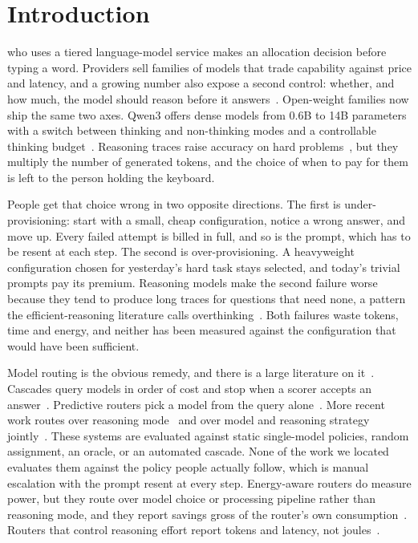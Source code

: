 \section{Introduction}
\label{sec:introduction}

 who uses a tiered language-model service makes an
allocation decision before typing a word. Providers sell families of models
that trade capability against price and latency, and a growing number also
expose a second control: whether, and how much, the model should reason
before it answers~\cite{openai_reasoning,anthropic_effort,google_thinking}.
Open-weight families
now ship the same two axes. Qwen3 offers dense models from 0.6B to 14B
parameters with a switch between thinking and non-thinking modes and a
controllable thinking budget~\cite{qwen3}. Reasoning traces raise accuracy
on hard problems~\cite{wei2022cot,deepseek2025r1}, but they multiply the
number of generated tokens, and the choice of when to pay for them is left
to the person holding the keyboard.

People get that choice wrong in two opposite directions. The first is
under-provisioning: start with a small, cheap configuration, notice a wrong
answer, and move up. Every failed attempt is billed in full, and so is the
prompt, which has to be resent at each step. The second is
over-provisioning. A heavyweight configuration chosen for yesterday's hard
task stays selected, and today's trivial prompts pay its premium. Reasoning
models make the second failure worse because they tend to produce long
traces for questions that need none, a pattern the efficient-reasoning
literature calls overthinking~\cite{sui2025stopoverthinking,
alomrani2025reasoningbudget}. Both failures waste tokens, time and energy,
and neither has been measured against the configuration that would have
been sufficient.

Model routing is the obvious remedy, and there is a large literature on
it~\cite{moslem2026routingsurvey}. Cascades query models in order of cost
and stop when a scorer accepts an answer~\cite{chen2023frugalgpt,
aggarwal2024automix}. Predictive routers pick a model from the query
alone~\cite{ding2024hybridllm,ong2024routellm}. More recent work routes over
reasoning mode~\cite{zhang2025synapseroute,lee2026dart} and over model and
reasoning strategy jointly~\cite{pan2026routetoreason}. These systems are
evaluated against static single-model policies, random assignment, an
oracle, or an automated cascade. None of the work we located evaluates
them against the policy people actually follow, which is manual escalation
with the prompt resent at every step. Energy-aware routers do measure power,
but they route over model choice or processing pipeline rather than
reasoning mode, and they report savings gross of the router's own
consumption~\cite{ziller2026greenserv,li2026ecothink}. Routers that control
reasoning effort report tokens and latency, not
joules~\cite{lee2026dart}.

